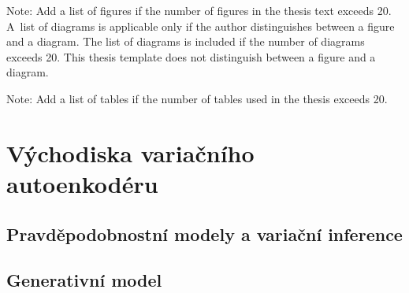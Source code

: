 \documentclass[11pt,a4paper]{report}
\let\openright=\clearpage
\begin{document}


\setcounter{tocdepth}{2}
\tableofcontents

\openright
\listoffigures
Note: Add a list of figures if the number of figures in the thesis text exceeds 20. A~list of diagrams is applicable only if the author distinguishes between a figure and a diagram. The list of diagrams is included if the number of diagrams exceeds 20. This thesis template does not distinguish between a figure and a diagram.

\clearpage
\listoftables
Note: Add a list of tables if the number of tables used in the thesis exceeds 20. 



\pagestyle{fancyx}
{%
\pagestyle{plain}

}

\chapter{Východiska variačního autoenkodéru}









\section{Pravděpodobnostní modely a variační inference}
\label{sec:probabilistic_models_variational_inference}

\section{Generativní model}
\label{sec:generative_model}
\end{document}
